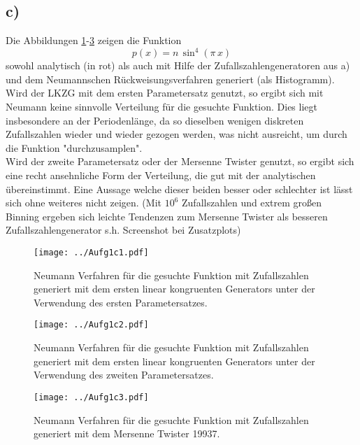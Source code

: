 \subsection*{c)}
Die Abbildungen \ref{c1}-\ref{c3} zeigen die Funktion
\begin{equation*}
	p(x) = n \, \sin^4{(\pi \, x)}
\end{equation*}
sowohl analytisch (in rot) als auch mit Hilfe der Zufallszahlengeneratoren aus a) und dem Neumannschen Rückweisungsverfahren generiert (als Histogramm).
Wird der LKZG mit dem ersten Parametersatz genutzt, so ergibt sich mit Neumann keine sinnvolle Verteilung für die gesuchte Funktion.
Dies liegt insbesondere an der Periodenlänge, da so dieselben wenigen diskreten Zufallszahlen wieder und wieder gezogen werden, was nicht ausreicht, um durch die Funktion "durchzusamplen".\\
Wird der zweite Parametersatz oder der Mersenne Twister genutzt, so ergibt sich eine recht ansehnliche Form der Verteilung, die gut mit der analytischen übereinstimmt.
Eine Aussage welche dieser beiden besser oder schlechter ist lässt sich ohne weiteres nicht zeigen.
(Mit $10^6$ Zufallszahlen und extrem großen Binning ergeben sich leichte Tendenzen zum Mersenne Twister als besseren Zufallszahlengenerator s.h. Screenshot bei Zusatzplots)

\begin{figure}
	\centering
	\texttt{[image: ../Aufg1c1.pdf]}
	\caption{Neumann Verfahren für die gesuchte Funktion mit Zufallszahlen generiert mit dem ersten linear kongruenten Generators unter der Verwendung des ersten Parametersatzes.}
	\label{c1}
\end{figure}

\begin{figure}
	\centering
	\texttt{[image: ../Aufg1c2.pdf]}
	\caption{Neumann Verfahren für die gesuchte Funktion mit Zufallszahlen generiert mit dem ersten linear kongruenten Generators unter der Verwendung des zweiten Parametersatzes.}
	\label{c2}
\end{figure}

\begin{figure}
	\centering
	\texttt{[image: ../Aufg1c3.pdf]}
	\caption{Neumann Verfahren für die gesuchte Funktion mit Zufallszahlen generiert mit dem Mersenne Twister 19937.}
	\label{c3}
\end{figure}

\FloatBarrier
